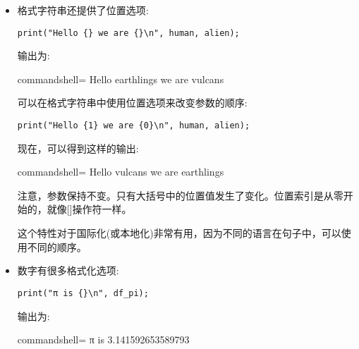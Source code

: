\begin{itemize}
这个简单的单行函数提供了一个有用的print()函数，可以用它来代替cout <{}< format()组合:

\begin{lstlisting}[style=styleCXX]
print("Hello {}\n", human);
\end{lstlisting}

输出为:

\begin{tcblisting}{commandshell={}}
Hello earthlings
\end{tcblisting}

该函数的更完整版本可以在示例文件的include目录中找到。

\item 
格式字符串还提供了位置选项:

\begin{lstlisting}[style=styleCXX]
print("Hello {} we are {}\n", human, alien);
\end{lstlisting}

输出为:

\begin{tcblisting}{commandshell={}}
Hello earthlings we are vulcans
\end{tcblisting}

可以在格式字符串中使用位置选项来改变参数的顺序:

\begin{lstlisting}[style=styleCXX]
print("Hello {1} we are {0}\n", human, alien);
\end{lstlisting}

现在，可以得到这样的输出:

\begin{tcblisting}{commandshell={}}
Hello vulcans we are earthlings
\end{tcblisting}

注意，参数保持不变。只有大括号中的位置值发生了变化。位置索引是从零开始的，就像[]操作符一样。

这个特性对于国际化(或本地化)非常有用，因为不同的语言在句子中，可以使用不同的顺序。

\item 
数字有很多格式化选项:

\begin{lstlisting}[style=styleCXX]
print("π is {}\n", df_pi);
\end{lstlisting}

输出为:

\begin{tcblisting}{commandshell={}}
π is 3.141592653589793
\end{tcblisting}


\end{itemize}
